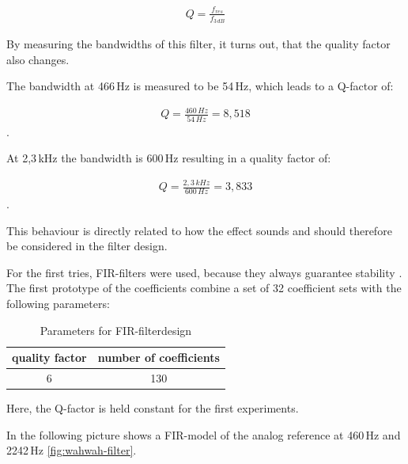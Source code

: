 \begin{align}
    Q = \frac{f_{res}}{f_{3\,dB}}
    \label{eq:q-factor}
\end{align}

By measuring the bandwidths of this filter, it turns out, that the quality factor also changes.

The bandwidth at 466\,Hz is measured to be 54\,Hz, which leads to a Q-factor of:

\begin{align}
    Q = \frac{460\,Hz}{54\,Hz} = 8,518
\end{align}
.

At 2,3\,kHz the bandwidth is 600\,Hz resulting in a quality factor of:

\begin{align}
    Q = \frac{2,3\,kHz}{600\,Hz} = 3,833
\end{align}
.

This behaviour is directly related to how the effect sounds and should therefore be considered in the filter design.

For the first tries, \ac{FIR}-filters were used, because they always guarantee stability \cite{meyer_signalverarbeitung}.
The first prototype of the coefficients combine a set of 32 coefficient sets with the following parameters:

\begin{table}[!h]
    \centering
    \caption{Parameters for \ac{FIR}-filterdesign}
    \label{table:fir-filterdesign}
    \begin{tabular}{c | c }
        quality factor & number of coefficients\\
        \hline
        6 & 130
    \end{tabular}
\end{table}

Here, the Q-factor is held constant for the first experiments.

In the following picture shows a \ac{FIR}-model of the analog reference at 460\,Hz and 2242\,Hz
\autoref{fig:wahwah-filter}.


